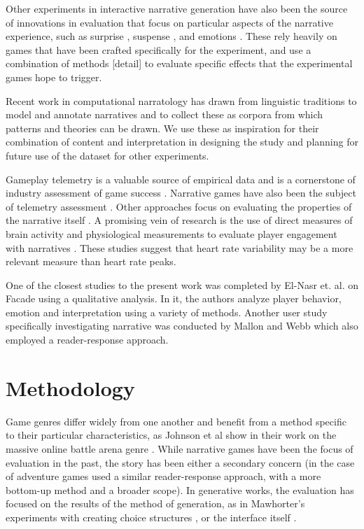 Other experiments in interactive narrative generation have also been
the source of innovations in evaluation that focus on particular
aspects of the narrative experience, such as surprise
\cite{Bae2014-au,Bae2008-js}, suspense \cite{Cheong2007-ts}, and
emotions \cite{Roberts2009-km}. These rely heavily on games that have
been crafted specifically for the experiment, and use a combination of
methods [detail] to evaluate specific effects that the experimental
games hope to trigger.

Recent work in computational narratology has drawn from linguistic
traditions to model and annotate narratives
\cite{Cataldi_undated-sf,Szilas2010-tg,Finlayson2011-tw} and to collect
these as corpora \cite{Elson2012-xn,Finlayson2013-wi} from which
patterns and theories can be drawn. We use these as inspiration for
their combination of content and interpretation in designing the study
and planning for future use of the dataset for other experiments.

Gameplay telemetry is a valuable source of empirical data and is a
cornerstone of industry assessment of game success
\cite{Drachen2015-hn}. Narrative games have also been the subject of
telemetry assessment \cite{Murtagh2014-wl}. Other approaches focus on
evaluating the properties of the narrative itself
\cite{Szilas2014-fd}. A promising vein of research is the use of
direct measures of brain activity and physiological measurements to
evaluate player engagement with narratives
\cite{Wallentin2011-mq}. These studies suggest that heart rate
variability may be a more relevant measure than heart rate peaks.

One of the closest studies to the present work was completed by
El-Nasr et. al. on Facade using a qualitative analysis. In it, the
authors analyze player behavior, emotion and interpretation using a
variety of methods. Another user study specifically investigating
narrative was conducted by Mallon and Webb \cite{Mallon2005-ck} which
also employed a reader-response approach.

\section{Methodology}
\label{sec:orgd085191}
Game genres differ widely from one another and benefit from a method
specific to their particular characteristics, as Johnson et al show in
their work on the massive online battle arena genre
\cite{Johnson2015-sd}. While narrative games have been the focus of
evaluation in the past, the story has been either a secondary concern
(in the case of adventure games \cite{Mallon2005-ck} used a similar
reader-response approach, with a more bottom-up method and a broader
scope). In generative works, the evaluation has focused on the results
of the method of generation, as in Mawhorter's experiments with
creating choice structures \cite{Mawhorter2013-ym,Szilas2014-fd}, or
the interface itself \cite{Mehta2007-gn}.


